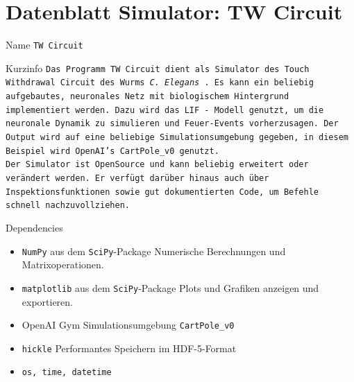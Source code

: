\chapter{Datenblatt Simulator: TW Circuit}
%
\label{app:datenblatt}
\enlargethispage{2\baselineskip}
\begin{minipage}[b]{0.61\textwidth}
	\begin{mybox}{Name}
		\texttt{TW Circuit}
	\end{mybox}
	\begin{mybox}{Kurzinfo}
		\texttt{Das Programm TW Circuit dient als Simulator des Touch Withdrawal Circuit des Wurms \textit{C. Elegans} \cite{WormLevelRL}. Es kann ein beliebig aufgebautes, neuronales Netz mit biologischem Hintergrund implementiert werden. Dazu wird das LIF - Modell genutzt, um die neuronale Dynamik zu simulieren und Feuer-Events vorherzusagen. Der Output wird auf eine beliebige Simulationsumgebung gegeben, in diesem Beispiel wird OpenAI's CartPole\_v0 genutzt.\\ Der Simulator ist OpenSource und kann beliebig erweitert oder verändert werden. Er verfügt darüber hinaus auch über Inspektionsfunktionen sowie gut dokumentierten Code, um Befehle schnell nachzuvollziehen.}
	\end{mybox}
	\begin{mybox}{Dependencies}
		\begin{itemize}
			\item \texttt{NumPy} aus dem \texttt{SciPy}-Package
			\subitem Numerische Berechnungen und Matrixoperationen.
			\item \texttt{matplotlib} aus dem \texttt{SciPy}-Package
			\subitem Plots und Grafiken anzeigen und exportieren.
			\item OpenAI Gym
			\subitem Simulationsumgebung \texttt{CartPole\_v0}
			\item \texttt{hickle}
			\subitem Performantes Speichern im HDF-5-Format
			\item \texttt{os, time, datetime}
		\end{itemize}
	\end{mybox}
\end{minipage}
